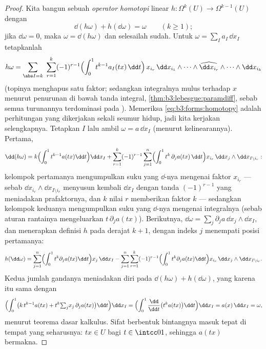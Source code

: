 \begin{proof}
Kita bangun sebuah \emph{operator homotopi} linear $h\colon
\Omega^k(U) \to \Omega^{k-1}(U)$ dengan
\begin{equation}\label{eq:b3:forms:homotopy}
\dd(h\omega) + h(\dd\omega) = \omega
\qquad (k \geq 1);
\end{equation}
jika $\dd\omega = 0$, maka $\omega = \dd(h\omega)$ dan selesailah
sudah. Untuk $\omega = \sum_I a_I\,\dd x_I$ tetapkanlah
\[
h\omega = \sum_{\abs I = k}\ \sum_{r=1}^{k}(-1)^{r-1}
\Bigl(\int_0^1 t^{k-1}a_I(tx)\,\dd t\Bigr)\,
x_{i_r}\,\dd x_{i_1}\wedge\dots\wedge
\widehat{\dd x_{i_r}}\wedge\dots\wedge\dd x_{i_k}
\]
(topinya menghapus satu faktor; sedangkan integralnya mulus terhadap $x$
menurut penurunan di bawah tanda integral,
\cref{thm:b3:lebesgue:paramdiff}, sebab semua turunannya
terdominasi pada ). Memeriksa
\eqref{eq:b3:forms:homotopy} adalah perhitungan yang dikerjakan sekali
seumur hidup, jadi kita kerjakan selengkapnya. Tetapkan $I$ lalu ambil $\omega =
a\,\dd x_I$ (menurut kelinearannya). Pertama,
\[
\dd(h\omega) = k\Bigl(\int_0^1t^{k-1}a(tx)\dd t\Bigr)\dd x_I
+ \sum_{r=1}^k(-1)^{r-1}\sum_{j=1}^n
\Bigl(\int_0^1t^{k}\,\partial_ja(tx)\,\dd t\Bigr)
x_{i_r}\,\dd x_j\wedge\dd x_{I\setminus i_r} :
\]
kelompok pertamanya mengumpulkan suku yang $\dd$-nya mengenai
faktor $x_{i_r}$ --- sebab  $\dd x_{i_r}\wedge\dd
x_{I\setminus i_r}$ menyusun kembali $\dd x_I$ dengan tanda
$(-1)^{r-1}$ yang meniadakan prafaktornya, dan $k$ nilai
$r$ memberikan faktor $k$ --- sedangkan kelompok keduanya
mengumpulkan suku yang $\dd$-nya mengenai integralnya (sebab aturan
rantainya mengeluarkan $t\,\partial_ja(tx)$). Berikutnya, $\dd\omega =
\sum_j\partial_ja\,\dd x_j\wedge\dd x_I$, dan menerapkan
definisi $h$ pada derajat $k+1$, dengan indeks $j$ menempati
posisi pertamanya:
\[
h(\dd\omega) = \sum_{j=1}^n\Bigl(\int_0^1t^{k}
\partial_ja(tx)\dd t\Bigr)x_j\,\dd x_I
- \sum_{j=1}^n\sum_{r=1}^k(-1)^{r-1}
\Bigl(\int_0^1t^{k}\partial_ja(tx)\dd t\Bigr)
x_{i_r}\,\dd x_j\wedge\dd x_{I\setminus i_r} .
\]
Kedua jumlah gandanya meniadakan diri pada $\dd(h\omega) + h(\dd\omega)$,
yang karena itu sama dengan
\[
\Bigl(\int_0^1\bigl(k\,t^{k-1}a(tx) +
t^k{\textstyle\sum_j}x_j\,\partial_ja(tx)\bigr)\dd t\Bigr)
\dd x_I
= \Bigl(\int_0^1\frac{\dd}{\dd t}\bigl(t^ka(tx)\bigr)\dd
t\Bigr)\dd x_I
= a(x)\,\dd x_I = \omega,
\]
menurut teorema dasar kalkulus. Sifat berbentuk bintangnya
masuk tepat di tempat yang seharusnya: $tx \in U$ bagi $t \in \intcc01$,
sehingga $a(tx)$ bermakna.
\end{proof}

